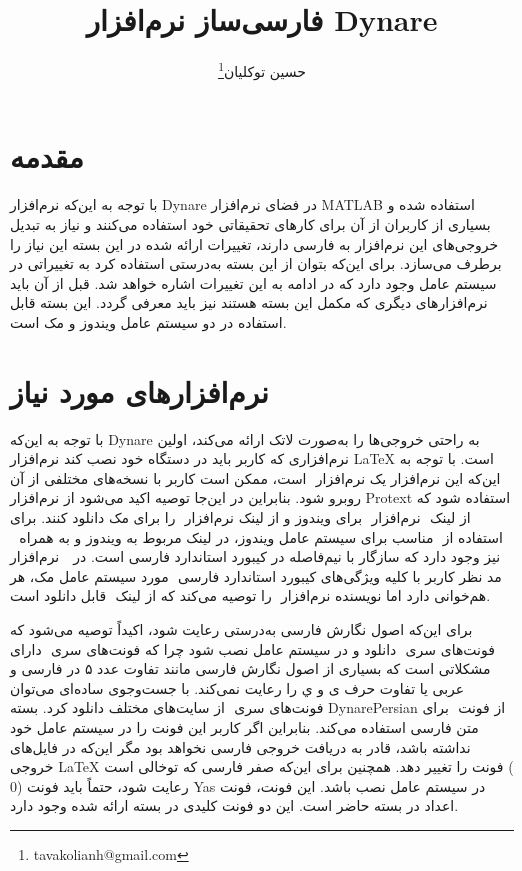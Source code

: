\documentclass[12pt]{article}
\title{فارسی‌ساز نرم‌افزار Dynare}
\author{حسین توکلیان\thanks{tavakolianh@gmail.com} }%
\affil{عضو هیئت علمی دانشکده اقتصاد دانشگاه علامه طباطبائی}
\begin{document}
 
\maketitle

\section{مقدمه}
با توجه به این‌که نرم‌افزار Dynare در فضای نرم‌افزار MATLAB استفاده شده و بسیاری از کاربران از آن برای کارهای تحقیقاتی خود استفاده می‌کنند و نیاز به تبدیل خروجی‌های این نرم‌افزار به فارسی دارند، تغییرات ارائه شده در این بسته این نیاز را برطرف می‌سازد. برای این‌که بتوان از این بسته به‌درستی استفاده کرد به تغییراتی در سیستم عامل وجود دارد که در ادامه به این تغییرات اشاره خواهد شد. قبل از آن باید نرم‌افزارهای دیگری که مکمل این بسته هستند نیز باید معرفی گردد. این بسته قابل استفاده در دو سیستم عامل ویندوز و مک است. 
\section{نرم‌افزارهای مورد نیاز}
با توجه به این‌که Dynare به راحتی خروجی‌ها را به‌صورت لاتک ارائه می‌کند، اولین نرم‌افزاری که کاربر باید در دستگاه خود نصب کند نرم‌افزار ‪\LaTeX‬‬ است. با توجه به این‌که این نرم‌افزار یک نرم‌افزار ‪‬‬‬ است، ممکن است کاربر با نسخه‌های مختلفی از آن روبرو شود. بنابراین در این‌جا توصیه اکید می‌شود از نرم‌افزار Protext استفاده شود که از لینک ‪‬‬‬ نرم‌افزار ‪‬‬ برای ویندوز و از لینک ‪‬‬‬ نرم‌افزار ‪‬‬‬ را برای مک دانلود کنند. برای استفاده از ‪‬‬‬ مناسب برای سیستم عامل ویندوز، در لینک مربوط به ویندوز و به همراه ‪‬‬ ‬‬ نرم‌افزار ‪‬‬ ‬‬‪  نیز وجود دارد که سازگار با نیم‌فاصله در کیبورد استاندارد فارسی است. در مورد سیستم عامل مک، هر ‪‬‬ ‬‬‬مد نظر کاربر با کلیه ویژگی‌های کیبورد استاندارد فارسی هم‌خوانی دارد اما نویسنده نرم‌افزار ‪‬‬ ‬‬‬را توصیه می‌کند که از لینک ‪‬‬‬ قابل دانلود است.

برای این‌که اصول نگارش فارسی به‌درستی رعایت شود، اکیداً توصیه می‌شود که فونت‌های سری ‪‬‬ دانلود و در سیستم‌ عامل نصب شود چرا که فونت‌های سری ‪‬‬ دارای مشکلاتی است که بسیاری از اصول نگارش فارسی مانند تفاوت عدد ۵ در فارسی و عربی یا تفاوت حرف ی و ي را رعایت نمی‌کند. با جست‌وجوی ساده‌ای می‌توان فونت‌های سری ‪‬‬ از سایت‌های مختلف دانلود کرد. بسته DynarePersian از فونت ‪‬‬‬ برای متن فارسی استفاده می‌کند. بنابراین اگر کاربر این فونت را در سیستم عامل خود نداشته باشد، قادر به دریافت خروجی فارسی نخواهد بود مگر این‌که در فایل‌های خروجی ‪\LaTeX‬‬‬ فونت را تغییر دهد. همچنین برای این‌که صفر فارسی که توخالی است (‪$0$‬‬‬‬) رعایت شود، حتماً باید فونت Yas در سیستم عامل نصب باشد. این فونت، فونت اعداد در بسته حاضر است. این دو فونت کلیدی در بسته ارائه شده وجود دارد.
\end{document}
